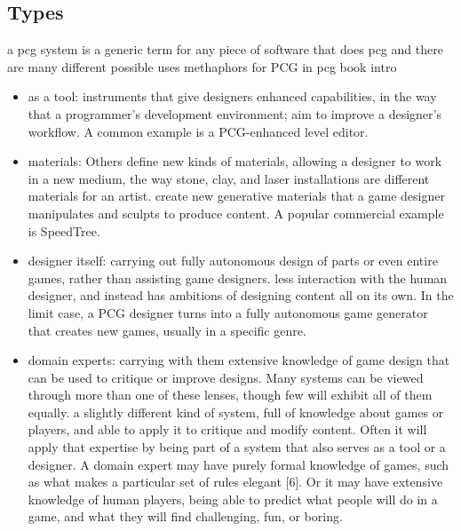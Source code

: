 \documentclass[MGS,Master,english]{twbook}%
\begin{document}
\subsection{Types}
a pcg system is a generic term for any piece of software that does pcg and there are many different possible uses \cite{pcg::book}
methaphors for PCG in pcg book intro\\
\begin{itemize}
	\item as a tool: instruments that give designers enhanced capabilities, in the way that a programmer’s development	environment; aim to improve a designer’s workflow. A common example is a PCG-enhanced level editor.
	\item materials:  Others define new kinds of materials, allowing a designer to work in a new medium, the way stone, clay, and laser installations are different materials for an artist. create new generative materials that a game designer manipulates and sculpts to produce content. A popular commercial example is SpeedTree.
	\item designer itself: carrying out fully autonomous design of parts or even entire games, rather than assisting game designers. less interaction with the human designer, and	instead has ambitions of designing content all on its own. In the limit case, a PCG designer turns into a fully autonomous game generator that creates new games, usually in a specific genre.
	\item domain experts: carrying with them extensive knowledge of game design that can be used to critique or improve designs. Many systems can be viewed through more	than one of these lenses, though few will exhibit all of them equally. a slightly different kind of system, full of knowledge about games or players, and able to apply it to critique and modify content. Often it will apply that expertise by being part of a system that also serves as a tool or a designer. A domain expert may have purely formal knowledge of games, such as what makes a particular set of rules elegant [6]. Or it may have extensive knowledge of human players, being able to predict what people will do in a game, and what they will find challenging, fun, or boring.
\end{itemize}
\end{document}
